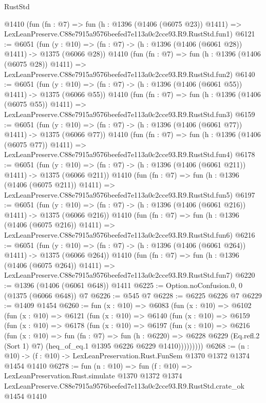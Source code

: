 \begin{lexlean}{RustStd}
\begin{coremodule}
    @1410
    (fun (fn : @7) =>
    fun (h : @1396 (@1406 (@6075 @23)) @1411) =>
    LexLeanPreserve.C88e7915a9576beefed7e113a0c2cce93.R9.RustStd.fun1)
@6121 := @6051
    (fun (y : @10) => (fn : @7) -> (h : @1396 (@1406 (@6061 @28)) @1411) -> @1375 (@6066 @28))
    @1410
    (fun (fn : @7) =>
    fun (h : @1396 (@1406 (@6075 @28)) @1411) =>
    LexLeanPreserve.C88e7915a9576beefed7e113a0c2cce93.R9.RustStd.fun2)
@6140 := @6051
    (fun (y : @10) => (fn : @7) -> (h : @1396 (@1406 (@6061 @55)) @1411) -> @1375 (@6066 @55))
    @1410
    (fun (fn : @7) =>
    fun (h : @1396 (@1406 (@6075 @55)) @1411) =>
    LexLeanPreserve.C88e7915a9576beefed7e113a0c2cce93.R9.RustStd.fun3)
@6159 := @6051
    (fun (y : @10) => (fn : @7) -> (h : @1396 (@1406 (@6061 @77)) @1411) -> @1375 (@6066 @77))
    @1410
    (fun (fn : @7) =>
    fun (h : @1396 (@1406 (@6075 @77)) @1411) =>
    LexLeanPreserve.C88e7915a9576beefed7e113a0c2cce93.R9.RustStd.fun4)
@6178 := @6051
    (fun (y : @10) => (fn : @7) -> (h : @1396 (@1406 (@6061 @211)) @1411) -> @1375 (@6066 @211))
    @1410
    (fun (fn : @7) =>
    fun (h : @1396 (@1406 (@6075 @211)) @1411) =>
    LexLeanPreserve.C88e7915a9576beefed7e113a0c2cce93.R9.RustStd.fun5)
@6197 := @6051
    (fun (y : @10) => (fn : @7) -> (h : @1396 (@1406 (@6061 @216)) @1411) -> @1375 (@6066 @216))
    @1410
    (fun (fn : @7) =>
    fun (h : @1396 (@1406 (@6075 @216)) @1411) =>
    LexLeanPreserve.C88e7915a9576beefed7e113a0c2cce93.R9.RustStd.fun6)
@6216 := @6051
    (fun (y : @10) => (fn : @7) -> (h : @1396 (@1406 (@6061 @264)) @1411) -> @1375 (@6066 @264))
    @1410
    (fun (fn : @7) =>
    fun (h : @1396 (@1406 (@6075 @264)) @1411) =>
    LexLeanPreserve.C88e7915a9576beefed7e113a0c2cce93.R9.RustStd.fun7)
@6220 := @1396 (@1406 (@6061 @648)) @1411
@6225 := Option.noConfusion.{0, 0} (@1375 (@6066 @648)) @7
@6226 := @545 @7
@6228 := @6225 @6226 @7
@6229 := @1409 @1454
@6260 := fun (x : @10) =>
  @6083
    (fun (x : @10) =>
    @6102
      (fun (x : @10) =>
      @6121
        (fun (x : @10) =>
        @6140
          (fun (x : @10) =>
          @6159
            (fun (x : @10) =>
            @6178
              (fun (x : @10) =>
              @6197
                (fun (x : @10) =>
                @6216
                  (fun (x : @10) =>
                  fun (fn : @7) =>
                  fun (h : @6220) =>
                  @6228
                    @6229
                    (Eq.refl.{2} (Sort 1) @7)
                    (heq_of_eq.{1} @1395 @6226 @6229 @1410)))))))))
@6268 := (n : @10) -> (f : @10) -> LexLeanPreservation.Rust.FunSem @1370 @1372 @1374 @1454 @1410
@6278 := fun (n : @10) =>
  fun (f : @10) =>
  LexLeanPreservation.Rust.simulate
    @1370
    @1372
    @1374
    LexLeanPreserve.C88e7915a9576beefed7e113a0c2cce93.R9.RustStd.crate_ok
    @1454
    @1410
\end{coremodule}
\end{lexlean}
